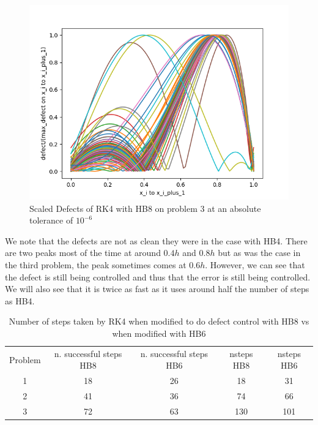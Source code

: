 \documentclass{article}
\begin{document}
\begin{figure}[H]
\centering
\includegraphics[width=0.7\linewidth]{./figures/rk4_with_hb8_p3_scaled_defects}
\caption{Scaled Defects of RK4 with HB8 on problem 3 at an absolute tolerance of $10^{-6}$}
\label{fig:rk4_with_hb8_p3_scaled_defects}
\end{figure}

We note that the defects are not as clean they were in the case with HB4. There are two peaks most of the time at around $0.4h$ and $0.8h$ but as was the case in the third problem, the peak sometimes comes at $0.6h$. However, we can see that the defect is still being controlled and thus that the error is still being controlled. We will also see that it is twice as fast as it uses around half the number of steps as HB4.

\begin{table}[h]
\caption {Number of steps taken by RK4 when modified to do defect control with HB8 vs when modified with HB6} \label{tab:rk4_with_hb8_nsteps}
\begin{center}
\begin{tabular}{ c c c c c } 
Problem & n. successful steps HB8 & n. successful steps HB6 & nsteps HB8 & nsteps HB6 \\ 
1       & 18                      &        26               & 18         & 31\\ 
2       & 41                      &        36               & 74         & 66\\
3       & 72                      &        63               & 130        & 101\\
\end{tabular}
\end{center}
\end{table}
\end{document}
